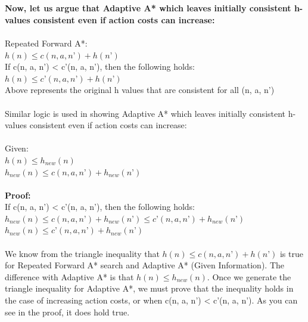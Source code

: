 \documentclass[12pt, letterpaper]{article}
\begin{document}
\\~\\
\textbf{Now, let us argue that Adaptive A* which leaves initially consistent h-values consistent even if action costs can increase:}
\\~\\
Repeated Forward A*:
\\
\(h(n) \le c(n, a, n’) + h(n’)\)	
\\If c(n, a, n’) < c’(n, a, n’), then the following holds:
\\
\(h(n) \le c’(n, a, n’) + h(n’)\)
\\Above represents the original h values that are consistent for all (n, a, n’)
\\
\\Similar logic is used in showing Adaptive A* which leaves initially consistent h-values consistent even if action costs can increase:
\\
\\Given:
\\
\(h(n) \le h_{new}(n)\)
\\
\(h_{new}(n) \le c(n, a, n’) + h_{new}(n’)\)		
\\
\\\textbf{Proof:}
\\If c(n, a, n’) < c’(n, a, n’), then the following holds:
\\
\(h_{new}(n) \le c(n, a, n’) + h_{new}(n’) \le c’(n, a, n’) + h_{new}(n’)\)
\\
\(h_{new}(n) \le c’(n, a, n’) + h_{new}(n’)\)
\\
\\We know from the triangle inequality that \(h(n) \le c(n, a, n’) + h(n’)\) is true for Repeated Forward A* search and Adaptive A* (Given Information). The difference with Adaptive A* is that \(h(n) \le h_{new}(n)\). Once we generate the triangle inequality for Adaptive A*, we must prove that the inequality holds in the case of increasing action costs, or when c(n, a, n’) < c’(n, a, n’). As you can see in the proof, it does hold true.


\pagebreak
\end{document}
